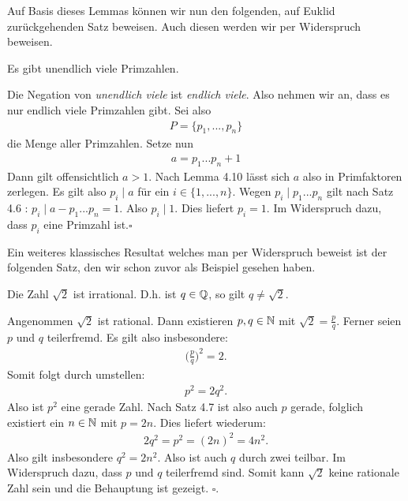 Auf Basis dieses Lemmas können wir nun den folgenden, auf Euklid zurückgehenden Satz beweisen. 
Auch diesen werden wir per Widerspruch beweisen. 

\begin{theorem}
    Es gibt unendlich viele Primzahlen. 
\end{theorem}

\begin{proof*}
    Die Negation von \textit{unendlich viele} ist \textit{endlich viele}. Also nehmen wir an, dass es nur endlich viele Primzahlen gibt. Sei also 
    \begin{align*}
        P = \{p_1,...,p_n\}
    \end{align*}
    die Menge aller Primzahlen. Setze nun
    \begin{align*}
        a = p_1 ... p_n + 1 
    \end{align*}
    Dann gilt offensichtlich $a>1$. Nach Lemma 4.10 lässt sich $a$ also in Primfaktoren zerlegen. Es gilt also $p_i \mid a$ für ein $i \in \{1,...,n\}$. 
    Wegen $p_i \mid p_1 ... p_n$ gilt nach Satz 4.6 : $p_i \mid a - p_1 ... p_n = 1$. Also $p_i \mid 1$. Dies liefert $p_i = 1$. Im Widerspruch dazu, dass $p_i$ eine Primzahl ist.\hfill $\square$ 
\end{proof*}

Ein weiteres klassisches Resultat welches man per Widerspruch beweist ist der folgenden Satz, den wir schon zuvor als Beispiel gesehen haben. 
\begin{theorem}
    Die Zahl $\sqrt{2}$ ist irrational. D.h. ist $q \in \mathbb{Q}$, so gilt $q \neq \sqrt{2}$. 
\end{theorem}
\begin{proof*}
    Angenommen $\sqrt{2}$ ist rational. Dann existieren $p,q \in \mathbb{N}$ mit $\sqrt{2} = \frac{p}{q}$. Ferner seien $p$ und $q$ teilerfremd. 
    Es gilt also insbesondere: 
    \begin{align*}
        \big(\frac{p}{q}\big)^2 = 2 . 
    \end{align*}
    Somit folgt durch umstellen: 
    \begin{align*}
        p^2 = 2q^2.
    \end{align*}
    Also ist $p^2$ eine gerade Zahl. Nach Satz 4.7 ist also auch $p$ gerade, folglich existiert ein $n \in \mathbb{N}$ mit $p = 2n$. 
    Dies liefert wiederum: 
    \begin{align*}
        2q^2 = p^2 = (2n)^2 = 4n^2. 
    \end{align*}
    Also gilt insbesondere $q^2 = 2n^2$. Also ist auch $q$ durch zwei teilbar. Im Widerspruch dazu, dass $p$ und $q$ teilerfremd sind. 
    Somit kann $\sqrt{2}$ keine rationale Zahl sein und die Behauptung ist gezeigt. \hfill $\square$. 

\end{proof*}

